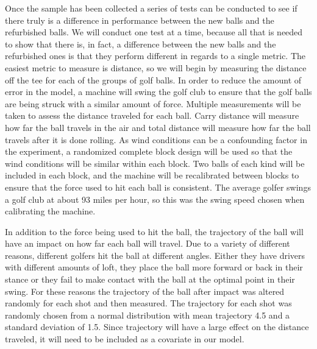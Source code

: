 \documentclass{article}\usepackage[]{graphicx}\usepackage[]{color}
\begin{document}
Once the sample has been collected a series of tests can be conducted to see if there truly is a difference in performance between the new balls and the refurbished balls. We will conduct one test at a time, because all that is needed to show that there is, in fact, a difference between the new balls and the refurbished ones is that they perform different in regards to a single metric. The easiest metric to measure is distance, so we will begin by measuring the distance off the tee for each of the groups of golf balls. In order to reduce the amount of error in the model, a machine will swing the golf club to ensure that the golf balls are being struck with a similar amount of force. Multiple measurements will be taken to assess the distance traveled for each ball. Carry distance will measure how far the ball travels in the air and total distance will measure how far the ball travels after it is done rolling. As wind conditions can be a confounding factor in the experiment, a randomized complete block design will be used so that the wind conditions will be similar within each block. Two balls of each kind will be included in each block, and the machine will be recalibrated between blocks to ensure that the force used to hit each ball is consistent. The average golfer swings a golf club at about 93 miles per hour, so this was the swing speed chosen when calibrating the machine.

In addition to the force being used to hit the ball, the trajectory of the ball will have an impact on how far each ball will travel. Due to a variety of different reasons, different golfers hit the ball at different angles. Either they have drivers with different amounts of loft, they place the ball more forward or back in their stance or they fail to make contact with the ball at the optimal point in their swing. For these reasons the trajectory of the ball after impact was altered randomly for each shot and then measured. The trajectory for each shot was randomly chosen from a normal distribution with mean trajectory 4.5 and a standard deviation of 1.5. Since trajectory will have a large effect on the distance traveled, it will need to be included as a covariate in our model. 
\end{document}
